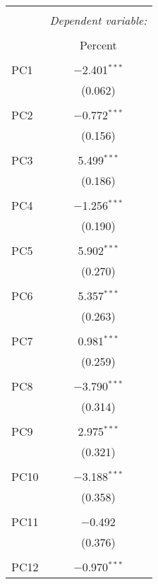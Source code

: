 
\begin{table}[!htbp] \centering 
  \caption{} 
  \label{} 
\begin{tabular}{@{\extracolsep{5pt}}lc} 
\\[-1.8ex]\hline 
\hline \\[-1.8ex] 
 & \multicolumn{1}{c}{\textit{Dependent variable:}} \\ 
\cline{2-2} 
\\[-1.8ex] & Percent \\ 
\hline \\[-1.8ex] 
 PC1 & $-$2.401$^{***}$ \\ 
  & (0.062) \\ 
  & \\ 
 PC2 & $-$0.772$^{***}$ \\ 
  & (0.156) \\ 
  & \\ 
 PC3 & 5.499$^{***}$ \\ 
  & (0.186) \\ 
  & \\ 
 PC4 & $-$1.256$^{***}$ \\ 
  & (0.190) \\ 
  & \\ 
 PC5 & 5.902$^{***}$ \\ 
  & (0.270) \\ 
  & \\ 
 PC6 & 5.357$^{***}$ \\ 
  & (0.263) \\ 
  & \\ 
 PC7 & 0.981$^{***}$ \\ 
  & (0.259) \\ 
  & \\ 
 PC8 & $-$3.790$^{***}$ \\ 
  & (0.314) \\ 
  & \\ 
 PC9 & 2.975$^{***}$ \\ 
  & (0.321) \\ 
  & \\ 
 PC10 & $-$3.188$^{***}$ \\ 
  & (0.358) \\ 
  & \\ 
 PC11 & $-$0.492 \\ 
  & (0.376) \\ 
  & \\ 
 PC12 & $-$0.970$^{***}$ \\ 

\end{tabular}
\end{table}
